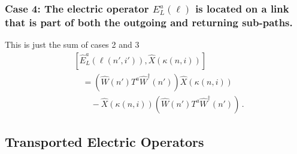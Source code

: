 \documentclass[reprint,superscriptaddress,pra,nofootinbib,preprintnumbers,floatfix]{revtex4-1}
\begin{document}
\subsubsection*{Case 4: The electric operator \texorpdfstring{$E_L^a(\ell)$}{Ea(l)} is located on a link that is part of both the outgoing and returning sub-paths. }
This is just the sum of cases 2 and 3
\begin{align}
    & [\hat E_L^a (\ell(n',i')), \hat X(\kappa(n,i))] \\
    & \quad =  \left( \hat W(n')T^a \hat W^\dagger(n') \right) \hat X(\kappa(n,i))\nonumber\\
    & \quad \quad - \hat X(\kappa(n,i)) \left( \hat W(n')T^a \hat W^\dagger(n') \right)
    \,.\nonumber
\end{align}


\subsection{Transported Electric Operators}
\end{document}
